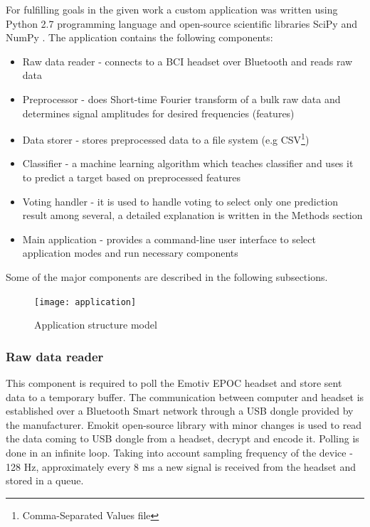 \documentclass[12pt]{article}
\theoremstyle{definition}
\begin{document}
For fulfilling goals in the given work a custom application was written using Python 2.7 programming language and open-source scientific libraries SciPy \cite{scipy} and NumPy \cite{numpy}. The application contains the following components:
\begin{itemize}
\item Raw data reader - connects to a BCI headset over Bluetooth and reads raw data
\item Preprocessor -  does Short-time Fourier transform of a bulk raw data and determines signal amplitudes for desired frequencies (features)
\item Data storer - stores preprocessed data to a file system (e.g CSV\footnote{Comma-Separated Values \cite{csv} file})
\item Classifier - a machine learning algorithm which teaches classifier and uses it to predict a target based on preprocessed features
\item Voting handler - it is used to handle voting to select only one prediction result among several, a detailed explanation is written in the Methods section
\item Main application - provides a command-line user interface to select application modes and run necessary components
\end{itemize}

Some of the major components are described in the following subsections.
\begin{figure} [ht]
\begin{center}
\texttt{[image: application]}
\caption{Application structure model}
\label{fig:fnCompModel}
\end{center}
\end{figure}

\subsubsection{Raw data reader}

This component is required to poll the Emotiv EPOC headset and store sent data to a temporary buffer. The communication between computer and headset is established over a Bluetooth Smart network through a USB dongle provided by the manufacturer. Emokit \cite{emokit} open-source library with minor changes is used to read the data coming to USB dongle from a headset, decrypt and encode it. Polling is done in an infinite loop. Taking into account sampling frequency of the device - 128 Hz, approximately every 8 ms a new signal is received from the headset and stored in a queue.
\end{document}
